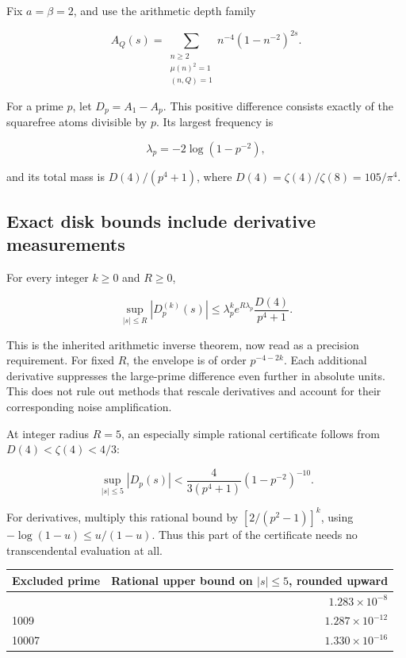 Fix \(a=\beta=2\), and use the arithmetic depth family

\[
A_Q(s)=\sum_{\substack{n\ge2\\\mu(n)^2=1\\(n,Q)=1}}
 n^{-4}(1-n^{-2})^{2s}.
\]

For a prime \(p\), let \(D_p=A_1-A_p\). This positive difference
consists exactly of the squarefree atoms divisible by \(p\). Its largest
frequency is

\[
\lambda_p=-2\log(1-p^{-2}),
\]

and its total mass is \(D(4)/(p^4+1)\), where
\(D(4)=\zeta(4)/\zeta(8)=105/\pi^4\).

\hypertarget{v11-resolution_full-exact-disk-bounds-include-derivative-measurements}{%
\subsection{Exact disk bounds include derivative
measurements}\label{v11-resolution_full-exact-disk-bounds-include-derivative-measurements}}

For every integer \(k\ge0\) and \(R\ge0\),

\[
\sup_{|s|\le R}|D_p^{(k)}(s)|
\le \lambda_p^k e^{R\lambda_p}\frac{D(4)}{p^4+1}.
\tag{RA-4}
\]

This is the inherited arithmetic inverse theorem, now read as a
precision requirement. For fixed \(R\), the envelope is of order
\(p^{-4-2k}\). Each additional derivative suppresses the large-prime
difference even further in absolute units. This does not rule out
methods that rescale derivatives and account for their corresponding
noise amplification.

At integer radius \(R=5\), an especially simple rational certificate
follows from \(D(4)<\zeta(4)<4/3\):

\[
\boxed{\sup_{|s|\le5}|D_p(s)|
 <\frac{4}{3(p^4+1)}(1-p^{-2})^{-10}.}
\tag{RA-5}
\]

For derivatives, multiply this rational bound by \([2/(p^2-1)]^k\),
using \(-\log(1-u)\le u/(1-u)\). Thus this part of the certificate needs
no transcendental evaluation at all.

\begin{longtable}[]{@{}lr@{}}
\toprule\noalign{}
Excluded prime & Rational upper bound on \(|s|\le5\), rounded upward \\
\midrule\noalign{}
\endhead
\bottomrule\noalign{}
\endlastfoot
101 & \(1.283\times10^{-8}\) \\
1009 & \(1.287\times10^{-12}\) \\
10007 & \(1.330\times10^{-16}\) \\
\end{longtable}


